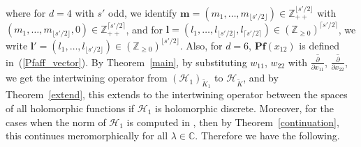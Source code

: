 \documentclass[pdftex]{sigma}
\numberwithin{equation}{section}
\newcommand{\bl}{\mathbf{l}}
\newcommand{\bm}{\mathbf{m}}
\newcommand{\BZ}{\mathbb{Z}}
\newcommand{\BC}{\mathbb{C}}
\newcommand{\cH}{\mathcal{H}}
\begin{document}
where for $d=4$ with $s'$ odd, we identify $\bm=(m_1,\ldots,m_{\lfloor s'/2\rfloor})\in\BZ_{++}^{\lfloor s'/2\rfloor}$ with $(m_1,\ldots,\allowbreak m_{\lfloor s'/2\rfloor},0)\in\BZ_{++}^{\lceil s'/2\rceil}$, and for $\bl=(l_1,\ldots,l_{\lfloor s'/2\rfloor},l_{\lceil s'/2\rceil})\in(\BZ_{\ge 0})^{\lceil s'/2\rceil}$, we write $\bl'=(l_1,\ldots,l_{\lfloor s'/2\rfloor})\allowbreak\in(\BZ_{\ge 0})^{\lfloor s'/2\rfloor}$. Also, for $d=6$, $\mathbf{Pf}(x_{12})$ is defined in~(\ref{Pfaff_vector}). By Theorem~\ref{main}, by substitu\-ting $w_{11}$, $w_{22}$ with $\overline{\frac{\partial}{\partial x_{11}}}$, $\overline{\frac{\partial}{\partial x_{22}}}$, we get the intertwining operator from $(\cH_1)_{\tilde{K}_1}$ to $\cH_{\tilde{K}}$, and by Theorem~\ref{extend}, this extends to the intertwining operator between the spaces of all holomorphic functions if $\cH_1$ is holomorphic discrete. Moreover, for the cases when the norm of $\cH_1$ is computed in \cite{N2}, then by Theorem~\ref{continuation}, this continues meromorphically for all $\lambda\in\BC$. Therefore we have the following.
\end{document}
